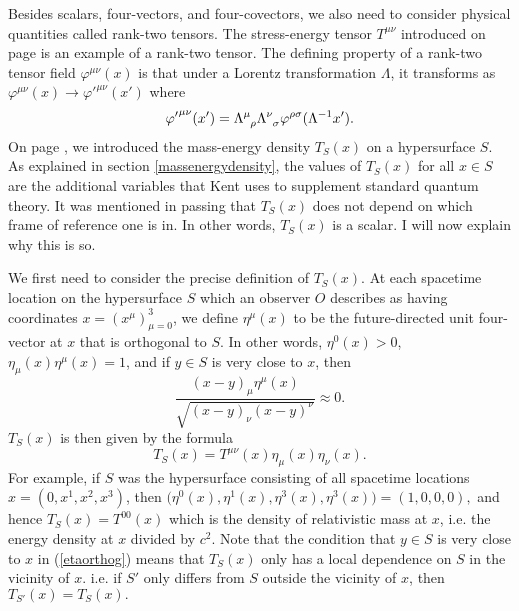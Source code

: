 Besides scalars, four-vectors, and four-covectors, we also need to consider physical quantities called rank-two tensors. The stress-energy tensor $T^{\mu\nu}$ introduced on page \pageref{stressenergy} is an example of a rank-two tensor. The defining property of a rank-two tensor field $\varphi^{\mu\nu}(x)$ is that under a Lorentz transformation $\Lambda$, it transforms as $\varphi^{\mu\nu}(x)\rightarrow{\varphi'}^{\mu\nu}(x')$ where
\begin{equation}\label{lorentztensor}
{\varphi'}^{\mu\nu}(x')=\Lambda\indices{^\mu_\rho}\Lambda\indices{^\nu_\sigma}\varphi^{\rho\sigma}(\Lambda^{-1}x').
\end{equation}
On page \pageref{massenergydensity}, we introduced the mass-energy density $T_S(x)$ on a hypersurface $S$. As explained in section \ref{massenergydensity}, the values of $T_S(x)$ for all $x\in S$ are the additional variables that Kent uses to supplement standard quantum theory.  It was mentioned in passing that $T_S(x)$ does not depend on which frame of reference one is in. In other words, $T_S(x)$ is a scalar. I will now explain why this is so. 

We first need to consider the precise definition of $T_S(x)$. At each spacetime location on the hypersurface $S$ which an observer $O$ describes as having coordinates $x=(x^\mu)_{\mu=0}^3$, we define  $\eta^\mu(x)$ to be the future-directed  unit four-vector at $x$ that is orthogonal to $S$. In other words, $\eta^0(x)>0$, $\eta_\mu(x)\eta^\mu(x)=1$, and if $y\in S$ is very close to $x$, then 
\begin{equation}\label{etaorthog}
\frac{(x-y)_\mu\eta^\mu(x)}{\sqrt{(x-y)_\nu(x-y)^\nu}}\approx 0.
\end{equation}$T_S(x)$ is then given by the formula 
\begin{equation}\label{TSdef}
T_S(x)=T^{\mu\nu}(x)\eta_{\mu}(x)\eta_{\nu}(x).
\end{equation}
For example, if $S$ was the hypersurface consisting of all spacetime locations $x = (0,x^1,x^2,x^3)$, then $\big(\eta^{0}(x),\eta^{1}(x),\eta^{3}(x),\eta^{3}(x)\big) =(1,0,0,0),$ and hence $T_S(x)=T^{00}(x)$ which is the density of relativistic mass at $x$, i.e. the energy density at $x$ divided by $c^2$. Note that the condition that $y\in S$ is very close to $x$ in (\ref{etaorthog}) means that $T_S(x)$ only has a local dependence \label{localdependenceS} on $S$ in the vicinity of $x$. i.e. if $S'$ only differs from $S$ outside the vicinity of $x$, then  $T_{S'}(x)=T_S(x).$

